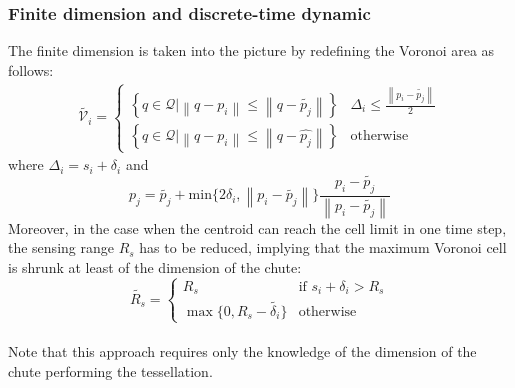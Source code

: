     \subsubsection{Finite dimension and discrete-time dynamic}
    The finite dimension is taken into the picture by redefining the Voronoi area as follows:
    \begin{gather}
        \tilde{\mathcal{V}_i} =
        \begin{cases} 
            \left\{ q \in \mathcal{Q} \lvert \left\lVert q-p_i \right\rVert \leq \left\lVert q-\tilde{p_j} \right\rVert\right\}  & \Delta_i \leq \frac{\left\lVert p_i - \tilde{p_j} \right\lVert}{2} \\
            \left\{ q \in \mathcal{Q} \lvert \left\lVert q-p_i \right\rVert \leq \left\lVert q-\hat{p_j} \right\rVert\right\} & \text{otherwise} 
        \end{cases} 
        \label{eq:Voronoi_finite_dimensions}
    \end{gather}
    where $\Delta_i = s_i + \delta_{i}$ and
    \begin{equation}
        \hat{p_j} = \tilde{p_j} + \text{min}\{2 \delta_i, \left\lVert p_i - \tilde{p_j} \right\lVert\}\frac{p_i - \tilde{p_j}}{\left\lVert p_i - \tilde{p_j} \right\lVert}
    \end{equation}
    Moreover, in the case when the centroid can reach the cell limit in one time step, the sensing range $R_s$ has to be reduced, implying that the maximum Voronoi cell is shrunk at least of the dimension of the chute:
    \begin{equation}
        \tilde{R_s} = 
        \begin{cases}
            R_s & \text{if } s_i + \delta_i > R_s\\
            \max\{0, R_s - \tilde{\delta_i}\} & \text{otherwise}
        \end{cases}
        \label{eq:rs}
    \end{equation}\\
    Note that this approach requires only the knowledge of the dimension of the chute performing the tessellation.

